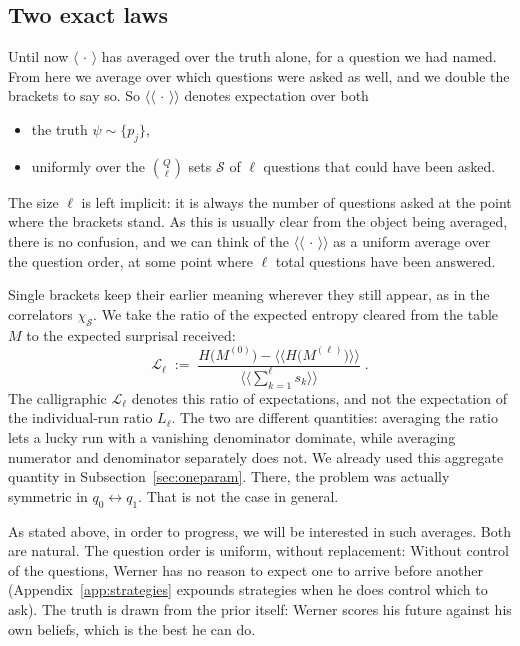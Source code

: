 \documentclass[11pt]{article}
\begin{document}
\subsection{Two exact laws}\label{sec:twolaws}

Until now $\langle\,\cdot\,\rangle$ has averaged over the truth alone,
for a question we had named. From here we average over which questions
were asked as well, and we double the brackets to say so.
So $\langle\!\langle\,\cdot\,\rangle\!\rangle$ denotes expectation over both

\begin{itemize}
  \item the truth $\psi \sim \{p_j\}$,
  \item uniformly over the $\binom Q\ell$ sets $\mathcal S$ of $\ell$ questions
    that could have been asked.
\end{itemize}
The size $\ell$ is left implicit: it is always the number of questions asked at
the point where the brackets stand. As this is usually clear from the object being averaged,
there is no confusion, and we can think of the $\langle\!\langle\,\cdot\,\rangle\!\rangle$ as a uniform average over the question order,
at some point where $\ell$ total questions have been answered.

Single brackets keep their earlier
meaning wherever they still appear, as in the correlators $\chi_{\mathcal S}$.
We take the ratio of
the expected entropy cleared from the table $M$ to the expected surprisal received:
\begin{equation}\label{eq:Lk-avg}
  \mathcal L_\ell \;:=\;
  \frac{H\big(M^{(0)}\big) - \big\langle\!\big\langle  H\big(M^{(\ell)}\big) \big\rangle\!\big\rangle}
       {\big\langle\!\big\langle \sum_{k=1}^{\ell} s_k \big\rangle\!\big\rangle}\;.
\end{equation}
%
The calligraphic $\mathcal L_\ell$ denotes this ratio of expectations,
and not the expectation of the individual-run ratio $L_\ell$. The two
are different quantities: averaging the ratio lets a lucky run with a
vanishing denominator dominate, while averaging numerator and
denominator separately does not. We already used this aggregate quantity in
Subsection~\ref{sec:oneparam}. There, the problem was actually symmetric in $q_0 \leftrightarrow q_1$. That is not the case in general.

As stated above, in order to progress, we will be interested in such averages. Both
are natural. The question order is uniform, without replacement:
Without control of the questions, Werner has no reason to expect one to arrive
before another (Appendix~\ref{app:strategies} expounds strategies when
he does control which to ask). The truth is drawn from the prior
itself: Werner scores his future against his own beliefs, which is the best he can do.
\end{document}
